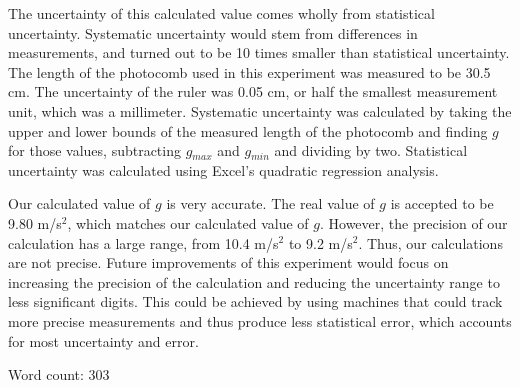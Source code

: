 \documentclass[11pt]{report}
\begin{document}
The uncertainty of this calculated value comes wholly from statistical uncertainty. Systematic
uncertainty would stem from differences in measurements, and turned out to be 10
times smaller than statistical uncertainty.  The length of the photocomb used in
this experiment was measured to be 30.5 cm.  The uncertainty of the ruler was
0.05 cm, or half the smallest measurement unit, which was a millimeter.
Systematic uncertainty was calculated by taking the upper and lower bounds of
the measured length of the photocomb and finding \(g\) for those values,
subtracting \(g\)$_{max}$ and \(g\)$_{min}$ and dividing by two. Statistical
uncertainty was calculated using Excel's quadratic regression analysis.  
    
Our calculated value of \(g\) is very accurate.  The real value of
\(g\) is accepted to be 9.80 m/s$^2$, which matches our calculated value of
\(g\).  However, the precision of our calculation has a large range, from 
10.4 m/s$^2$ to 9.2 m/s$^2$.  Thus, our calculations are not precise.
Future improvements of this experiment would focus on increasing the precision
of the calculation and reducing the uncertainty range to less significant digits.  
This could be achieved by using machines that could track more precise
measurements and thus produce less statistical error, which accounts for most
uncertainty and error.

Word count: 303





\end{document}
